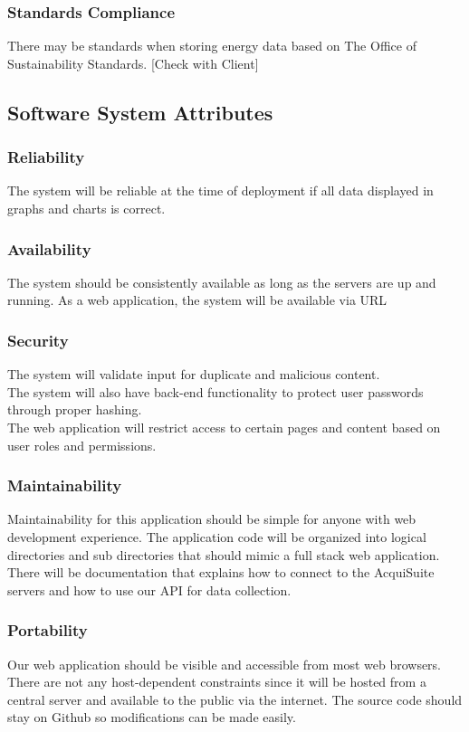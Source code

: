 \documentclass[journal,10pt,onecolumn,compsoc]{IEEEtran}
\begin{document}
    \subsubsection{Standards Compliance}
    There may be standards when storing energy data based on The Office of Sustainability Standards.
    [Check with Client]

    \subsection{Software System Attributes}
    
    \subsubsection{Reliability}
    The system will be reliable at the time of deployment if all data displayed in graphs and charts is correct.\\
    \subsubsection{Availability}
    The system should be consistently available as long as the servers are up and running. As a web application, the system will be available via URL 
    \subsubsection{Security}
    The system will validate input for duplicate and malicious content.\\
    The system will also have back-end functionality to protect user passwords through proper hashing.\\
    The web application will restrict access to certain pages and content based on user roles and permissions.

    \subsubsection{Maintainability}
    Maintainability for this application should be simple for anyone with web development experience. The application code will be organized into logical directories and sub directories that should mimic a full stack web application. There will be documentation that explains how to connect to the AcquiSuite servers and how to use our API for data collection.
    \subsubsection{Portability}
    Our web application should be visible and accessible from most web browsers. There are not any host-dependent constraints since it will be hosted from a central server and available to the public via the internet. The source code should stay on Github so modifications can be made easily.
    
\end{document}
